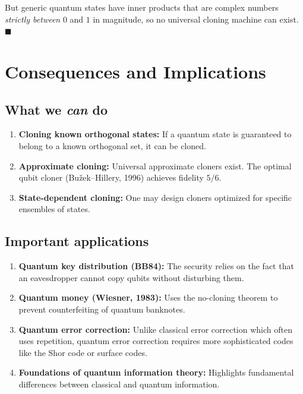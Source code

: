 \documentclass[12pt]{article}
\begin{document}
But generic quantum states have inner products that are complex numbers 
\emph{strictly between} $0$ and $1$ in magnitude, so no universal cloning 
machine can exist. $\blacksquare$

\section{Consequences and Implications}

\subsection{What we \textit{can} do}

\begin{enumerate}
    \item \textbf{Cloning known orthogonal states:}  
    If a quantum state is guaranteed to belong to a known orthogonal set, it can be cloned.
    
    \item \textbf{Approximate cloning:}  
    Universal approximate cloners exist. The optimal qubit cloner (Bužek–Hillery, 1996) achieves fidelity $5/6$.
    
    \item \textbf{State-dependent cloning:}  
    One may design cloners optimized for specific ensembles of states.
\end{enumerate}

\subsection{Important applications}

\begin{enumerate}
    \item \textbf{Quantum key distribution (BB84):} The security relies on the fact that an eavesdropper cannot copy qubits without disturbing them.
    
    \item \textbf{Quantum money (Wiesner, 1983):} Uses the no-cloning theorem to prevent counterfeiting of quantum banknotes.
    
    \item \textbf{Quantum error correction:} Unlike classical error correction which often uses repetition, quantum error correction requires more sophisticated codes like the Shor code or surface codes.
    
    \item \textbf{Foundations of quantum information theory:} Highlights fundamental differences between classical and quantum information.
\end{enumerate}
\end{document}
